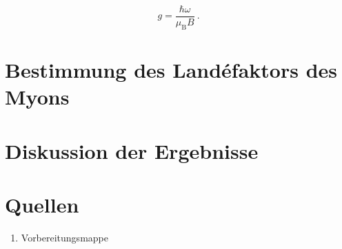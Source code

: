 \documentclass[a4paper,ngerman]{scrartcl}
\begin{document}
\begin{equation}
g = \frac{\hbar \omega}{\mu_\mathrm{B} B} ~.
\end{equation}

\section{Bestimmung des Landéfaktors des Myons}




\section{Diskussion der Ergebnisse}




\section{Quellen}
\begin{enumerate}
\item Vorbereitungsmappe 
\end{enumerate}
\end{document}
